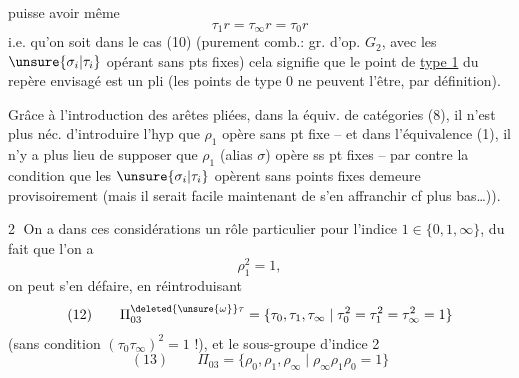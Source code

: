 
puisse avoir  même
\[
\tau_1r=\tau_\infty r=\tau_0r
\]
i.e. qu'on soit dans le cas (10) (purement comb.: gr. d'op. $G_2$, avec les $\unsure{\sigma_i|\tau_i}$ opérant sans pts fixes) cela signifie que le point de \uline{type 1} du repère envisagé est un pli (les points de type 0 ne peuvent l'être, par définition).

Grâce à l'introduction des arêtes pliées, dans la équiv. de catégories (8), il n'est plus néc. d'introduire l'hyp que $\rho_1$ opère sans pt fixe -- et dans l'équivalence (1), il n'y a plus lieu de supposer que $\rho_1$ (alias $\sigma$) opère ss pt fixes -- par contre la condition que les $\unsure{\sigma_i|\tau_i}$ opèrent sans points fixes demeure provisoirement (mais il serait facile maintenant de s'en affranchir  cf plus bas\ldots)).

\textcircled{2} On a dans ces considérations un rôle particulier pour l'indice $1\in\{0,1,\infty\}$, du fait que l'on a
\[
\rho_1^2=1,
\]
on peut s'en défaire, en réintroduisant
\[
(12)\qquad\Pi_{03}^{\deleted{\unsure{\omega}}\tau}=\{\tau_0,\tau_1,\tau_\infty\mid\tau_0^2=\tau_1^2=\tau_\infty^2=1\}
\]
(sans condition $(\tau_0\tau_\infty)^2=1$ !), et le sous-groupe d'indice 2
\[
(13)\qquad\Pi_{03}=\{\rho_0,\rho_1,\rho_\infty\mid\rho_\infty\rho_1\rho_0=1\}
\]
